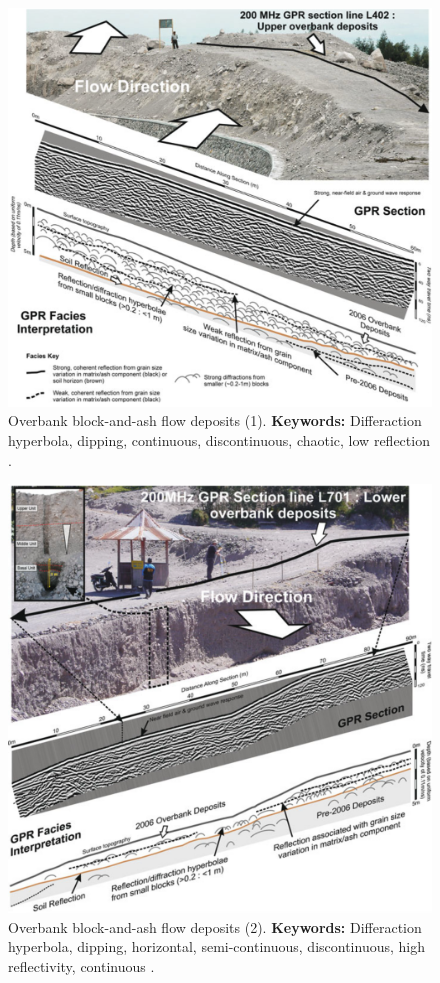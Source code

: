 \begin{figure}[h!]
    \centering
    \includegraphics[width=0.9\linewidth]{Figures/0.2GPR/Gertisser2009_Block_Ash_1.png}
    \caption[Overbank block-and-ash flow deposits (1).]{Overbank block-and-ash flow deposits (1). \textbf{Keywords: } Differaction hyperbola, dipping, continuous, discontinuous, chaotic, low reflection \citep{Gertisser2012}.}
    \label{fig:Gertisser2012-1}
\end{figure}
\clearpage
\begin{figure}[h!]
    \centering
    \includegraphics[width=0.9\linewidth]{Figures/0.2GPR/Gertisser2009_Block_Ash_2.png}
    \caption[Overbank block-and-ash flow deposits (2).]{Overbank block-and-ash flow deposits (2). \textbf{Keywords: } Differaction hyperbola, dipping, horizontal, semi-continuous, discontinuous, high reflectivity, continuous \citep{Gertisser2012}.}
    \label{fig:Gertisser2012-2}
\end{figure}
\clearpage

